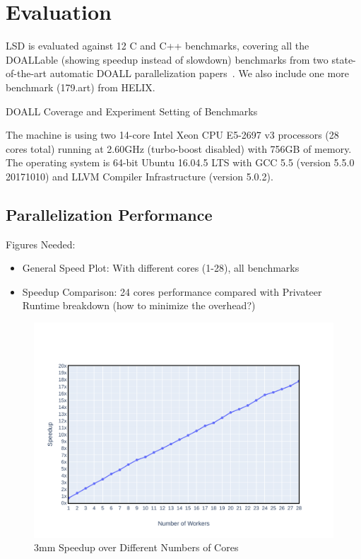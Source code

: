 \section{Evaluation}

LSD is evaluated against 12 C and C++ benchmarks, covering all the DOALLable
(showing speedup instead of slowdown) benchmarks from two state-of-the-art
automatic DOALL parallelization papers~\cite{johnson:12:pldi,kim:12:cgo}. We
also include one more benchmark (179.art) from HELIX.

\begin{table}
  
  \caption{
    DOALL Coverage and Experiment Setting of Benchmarks
  }
  \label{tab:benchmark-list}
    \vspace{-5pt}
\end{table}

The machine is using two 14-core Intel Xeon CPU E5-2697 v3 processors (28 cores
total) running at 2.60GHz (turbo-boost disabled) with 756GB of memory. The
operating system is 64-bit Ubuntu 16.04.5 LTS with GCC 5.5 (version 5.5.0
20171010) and LLVM Compiler Infrastructure (version 5.0.2).


\subsection{Parallelization Performance}
Figures Needed:
\begin{itemize}
\item General Speed Plot: With different cores (1-28), all benchmarks
\item Speedup Comparison: 24 cores performance compared with Privateer
Runtime breakdown (how to minimize the overhead?)

\end{itemize}

\begin{figure}[htp]
  \includegraphics[width=\textwidth]{figures/3mm-scale-crop}
  \caption{3mm Speedup over Different Numbers of Cores}
  \label{fig:3mm-scale}
\end{figure}

